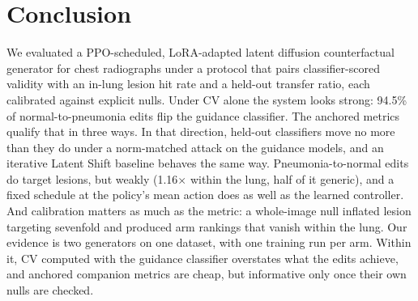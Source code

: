 \section{Conclusion}
\label{sec:conclusion}

We evaluated a PPO-scheduled, LoRA-adapted latent diffusion counterfactual generator for chest radiographs under a protocol that pairs classifier-scored validity with an in-lung lesion hit rate and a held-out transfer ratio, each calibrated against explicit nulls. Under CV alone the system looks strong: 94.5\% of normal-to-pneumonia edits flip the guidance classifier. The anchored metrics qualify that in three ways. In that direction, held-out classifiers move no more than they do under a norm-matched attack on the guidance models, and an iterative Latent Shift baseline behaves the same way. Pneumonia-to-normal edits do target lesions, but weakly (1.16$\times$ within the lung, half of it generic), and a fixed schedule at the policy's mean action does as well as the learned controller. And calibration matters as much as the metric: a whole-image null inflated lesion targeting sevenfold and produced arm rankings that vanish within the lung. Our evidence is two generators on one dataset, with one training run per arm. Within it, CV computed with the guidance classifier overstates what the edits achieve, and anchored companion metrics are cheap, but informative only once their own nulls are checked.
